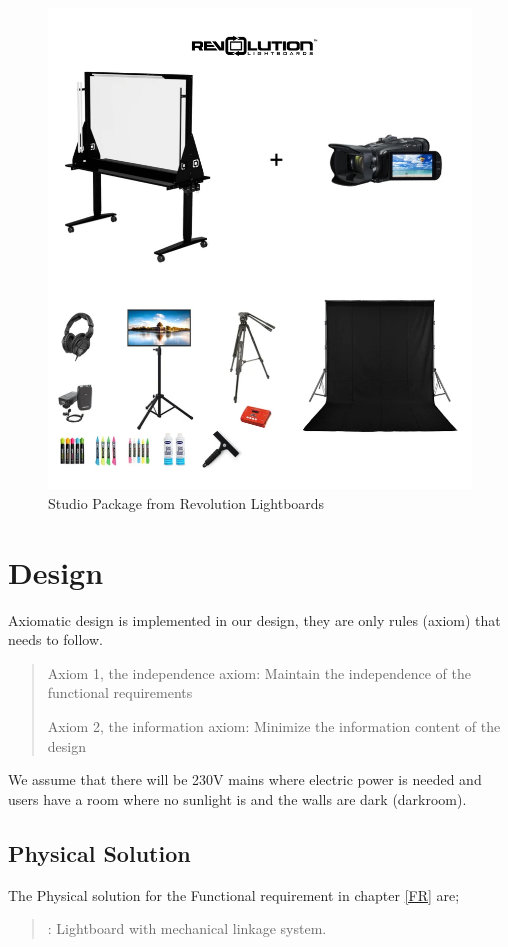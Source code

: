 \documentclass[a4paper]{jpconf}
\begin{document}
	\begin{figure}
		\centering
		\includegraphics[width=0.7\linewidth]{Revolution.png}
		\caption{ Studio Package from Revolution Lightboards \cite{Revolution}}
		\label{fig:REV}
	\end{figure}
	
	
	
	
	
	
	\section{Design}
	Axiomatic design is implemented in our design, they are only rules (axiom) that needs to follow\cite{suh2001axiomatic}.  
	\begin{quote}
		Axiom 1, the independence axiom:
		Maintain the independence of the functional requirements
		
		Axiom 2, the information axiom:
		Minimize the information content of the design
	\end{quote}
	
	We assume that there will be 230V mains where electric power is needed and users have a room where no sunlight is and the walls are dark (darkroom).     %
	
	\subsection{Physical Solution}\label{PS}
	The Physical solution for the Functional requirement in chapter \ref{FR} are;
	\begin{quote} 
		\textbf{} : Lightboard with mechanical linkage system.
	\end{quote}
	
\end{document}
